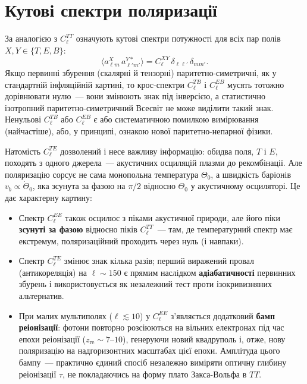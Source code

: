 \section{Кутові спектри поляризації}
\label{subsec:pol_spectra}

За аналогією з $C_\ell^{TT}$ означують кутові спектри потужності
для всіх пар полів $X,Y \in \{T,E,B\}$:
\begin{equation}\label{eq:pol_spectra_def}
    \langle a_{\ell m}^{X}\, a_{\ell' m'}^{Y*} \rangle
    = C_\ell^{XY}\, \delta_{\ell\ell'}\, \delta_{mm'}.
\end{equation}
Якщо первинні збурення (скалярні й тензорні) паритетно-симетричні,
як у стандартній інфляційній картині, то крос-спектри $C_\ell^{TB}$ і
$C_\ell^{EB}$ мусять тотожно дорівнювати нулю~--- вони змінюють знак
під інверсією, а статистично ізотропний паритетно-симетричний
Всесвіт не може виділити такий знак. Ненульові $C_\ell^{TB}$ або
$C_\ell^{EB}$ є або систематичною помилкою вимірювання (найчастіше),
або, у принципі, ознакою нової паритетно-непарної фізики.

Натомість $C_\ell^{TE}$ дозволений і несе важливу інформацію: обидва
поля, $T$ і $E$, походять з одного джерела~--- акустичних осциляцій
плазми до рекомбінації. Але поляризацію сорсує не сама монопольна
температура $\Theta_0$, а швидкість баріонів $v_b \propto \dot\Theta_0$,
яка зсунута за фазою на $\pi/2$ відносно $\Theta_0$ у акустичному
осциляторі. Це дає характерну картину:
\begin{itemize}
    \item Спектр $C_\ell^{EE}$ також осцилює з піками акустичної
          природи, але його піки \textbf{зсунуті за фазою} відносно
          піків $C_\ell^{TT}$~--- там, де температурний спектр має
          екстремум, поляризаційний проходить через нуль (і навпаки).
    \item Спектр $C_\ell^{TE}$ змінює знак кілька разів; перший
          виражений провал (антикореляція) на $\ell \sim 150$ є
          прямим наслідком \textbf{адіабатичності} первинних збурень
          і використовується як незалежний тест проти ізокривизняних
          альтернатив.
    \item При малих мультиполях ($\ell \lesssim 10$) у $C_\ell^{EE}$
          з'являється додатковий \textbf{бамп реіонізації}: фотони
          повторно розсіюються на вільних електронах під час епохи
          реіонізації ($z_{\text{re}} \sim 7$--$10$), генеруючи новий
          квадруполь і, отже, нову поляризацію на надгоризонтних
          масштабах цієї епохи. Амплітуда цього бампу~--- практично
          єдиний спосіб незалежно виміряти оптичну глибину реіонізації
          $\tau$, не покладаючись на форму плато Закса-Вольфа в $TT$.
\end{itemize}

